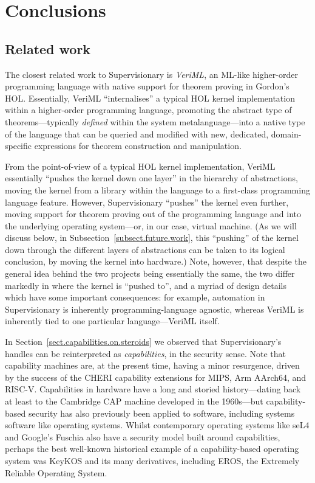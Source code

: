 \documentclass[a4paper, UKenglish, cleveref, autoref, thm-restate, colorlinks]{lipics-v2021}
\begin{document}
\section{Conclusions}
\label{sect.conclusions}

\subsection{Related work}

The closest related work to Supervisionary is \emph{VeriML}, an ML-like higher-order programming language with native support for theorem proving in Gordon's HOL.
Essentially, VeriML ``internalises'' a typical HOL kernel implementation within a higher-order programming language, promoting the abstract type of theorems---typically \emph{defined} within the system metalanguage---into a native type of the language that can be queried and modified with new, dedicated, domain-specific expressions for theorem construction and manipulation.

From the point-of-view of a typical HOL kernel implementation, VeriML essentially ``pushes the kernel down one layer'' in the hierarchy of abstractions, moving the kernel from a library within the language to a first-class programming language feature.
However, Supervisionary ``pushes'' the kernel even further, moving support for theorem proving out of the programming language and into the underlying operating system---or, in our case, virtual machine.
(As we will discuss below, in Subsection~\ref{subsect.future.work}, this ``pushing'' of the kernel down through the different layers of abstractions can be taken to its logical conclusion, by moving the kernel into hardware.)
Note, however, that despite the general idea behind the two projects being essentially the same, the two differ markedly in where the kernel is ``pushed to'', and a myriad of design details which have some important consequences: for example, automation in Supervisionary is inherently programming-language agnostic, whereas VeriML is inherently tied to one particular language---VeriML itself.

In Section~\ref{sect.capabilities.on.steroids} we observed that Supervisionary's handles can be reinterpreted as \emph{capabilities}, in the security sense.
Note that capability machines are, at the present time, having a minor resurgence, driven by the success of the CHERI capability extensions for MIPS, Arm AArch64, and RISC-V.
Capabilities in hardware have a long and storied history---dating back at least to the Cambridge CAP machine developed in the 1960s---but capability-based security has also previously been applied to software, including systems software like operating systems.
Whilst contemporary operating systems like seL4 and Google's Fuschia also have a security model built around capabilities, perhaps the best well-known historical example of a capability-based operating system was KeyKOS and its many derivatives, including EROS, the Extremely Reliable Operating System.
\end{document}
